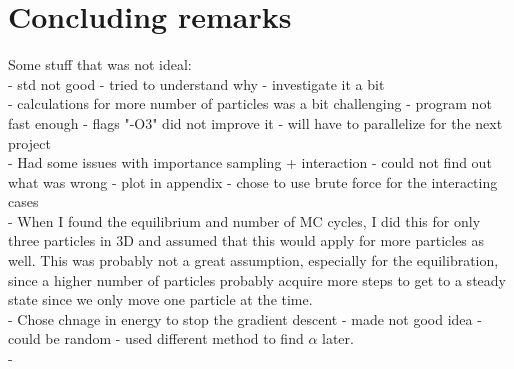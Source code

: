 \section{Concluding remarks}
Some stuff that was not ideal:\\
- std not good - tried to understand why - investigate it a bit\\
- calculations for more number of particles was a bit challenging - program not fast enough - flags "-O3" did not improve it - will have to parallelize for the next project\\
- Had some issues with importance sampling + interaction - could not find out what was wrong - plot in appendix - chose to use brute force for the interacting cases\\
- When I found the equilibrium and number of MC cycles, I did this for only three particles in 3D and assumed that this would apply for more particles as well. This was probably not a great assumption, especially for the equilibration, since a higher number of particles probably acquire more steps to get to a steady state since we only move one particle at the time.\\
- Chose chnage in energy to stop the gradient descent - made not good idea - could be random - used different method to find $\alpha$ later.\\
-

